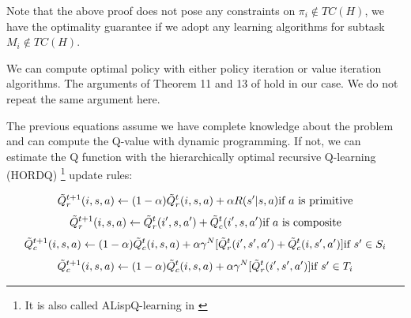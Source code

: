 \documentclass{article} %
\begin{document}
Note that the above proof does not pose any constraints on $\pi_i \notin TC(H)$, we have the optimality
guarantee if we adopt any learning algorithms for subtask $M_i \notin TC(H)$.

We can compute optimal policy with either policy iteration or value iteration algorithms. The arguments of
Theorem 11 and 13 of \cite{HORDQ} hold in our case. We do not repeat the same argument here.
 
The previous equations assume we have complete knowledge about the problem and can compute
the Q-value with dynamic programming. If not, we can estimate the Q function with
the hierarchically optimal recursive Q-learning (HORDQ) \footnote{It is also called ALispQ-learning in \cite{OptimalQ}} \cite{HORDQ} 
update rules:

\begin{equation}
    \tilde{Q}_r^{t+1}(i, s, a) \leftarrow
    (1 - \alpha)\tilde{Q}_r^{t}(i, s, a) + \alpha R(s'| s, a)   \mbox{if $a$ is primitive} \\
\end{equation}
\begin{equation}
    \tilde{Q}_r^{t+1}(i, s, a) \leftarrow
    \tilde{Q}_r^{t}(i', s, a') + \tilde{Q}_c^{t}(i', s, a')  \mbox{if $a$ is composite} \\
    \label{eq:TdQr}
\end{equation}
\begin{equation}
    \tilde{Q}_c^{t+1}(i, s, a) \leftarrow
    (1 - \alpha)\tilde{Q}_c^{t}(i, s, a) + \alpha \gamma^N[\tilde{Q}_r^{t}(i', s', a') + \tilde{Q}_c^t(i, s', a')]   \mbox{if $s' \in S_i$} \\
\end{equation}
\begin{equation}
    \tilde{Q}_c^{t+1}(i, s, a) \leftarrow
    (1 - \alpha)\tilde{Q}_c^{t}(i, s, a) + \alpha \gamma^N[\tilde{Q}_r^{t}(i', s', a')]   \mbox{if $s' \in T_i$} \\
    \label{eq:TdQc}
\end{equation}
\end{document}
